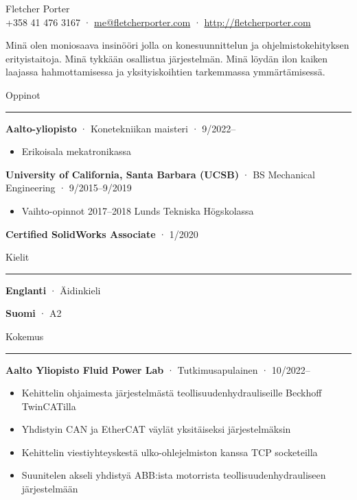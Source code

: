 \documentclass[12pt, oneside]{article}
\newcommand{\titlestyle}[1] {
	{\fontsize{40pt}{1em}\selectfont \textcolor{new_red}{\textsf{#1}}} \\
}
\newcommand{\headingstyleJobs}[1] {
	{\fontsize{18pt}{1em}\selectfont \textcolor{new_red}{\textsf{#1}}}
	\textcolor{new_red}{\rule{3.25in}{0.5pt}} \vspace{3pt}
}
\newcommand{\infostyle}[1] {
	{\selectfont #1} \\ %
}
\newcommand{\jobtitle}[3] {
	{\bf #1} · {#2} · {#3} \vspace{-7pt} \\
}
\newcommand{\certification}[2] {
	{\bf #1} · {#2}
}
\renewenvironment{quote}{%
  \list{}{%
    \leftmargin4pt
    \rightmargin\leftmargin
  }
  \item\relax
}
{\endlist}
\newcommand{\overview}[1] {
	\begin{quote}
		#1
	\end{quote}
}
\begin{document}
\begin{flushleft}



\titlestyle{Fletcher Porter}
\infostyle{+358 41 476 3167 · \href{mailto:me@fletcherporter.com}{me@fletcherporter.com} · \url{http://fletcherporter.com}}

\overview{
Minä olen moniosaava insinööri jolla on konesuunnittelun ja ohjelmistokehityksen erityistaitoja.  Minä tykkään osallistua järjestelmän.  Minä löydän ilon kaiken laajassa hahmottamisessa ja yksityiskoihtien tarkemmassa ymmärtämisessä.
}

\headingstyleJobs{Oppinot}

\jobtitle{Aalto-yliopisto}{Konetekniikan maisteri}{9/2022–}
\begin{itemize}
    \item Erikoisala mekatronikassa
\end{itemize}

\jobtitle{University of California, Santa Barbara (UCSB)}{BS Mechanical Engineering}{9/2015–9/2019}
\begin{itemize}
	\item Vaihto-opinnot 2017–2018 Lunds Tekniska Högskolassa \\
\end{itemize}


\certification{Certified SolidWorks Associate}{1/2020} \vspace{5pt}

\headingstyleJobs{Kielit}

\certification{Englanti}{Äidinkieli} \certification{Suomi}{A2} \vspace{5pt}

\headingstyleJobs{Kokemus}

\jobtitle{Aalto Yliopisto Fluid Power Lab}{Tutkimusapulainen}{10/2022–}
\begin{itemize}
	\item Kehittelin ohjaimesta järjestelmästä teollisuudenhydrauliseille Beckhoff TwinCATilla \\
	\item Yhdistyin CAN ja EtherCAT väylät yksitäiseksi järjestelmäksin \\
	\item Kehittelin viestiyhteyskestä ulko-ohlejelmiston kanssa TCP socketeilla \\
	\item Suunitelen akseli yhdistyä ABB:ista motorrista teollisuudenhydrauliseen järjestelmään
\end{itemize}


\end{flushleft}
\end{document}
